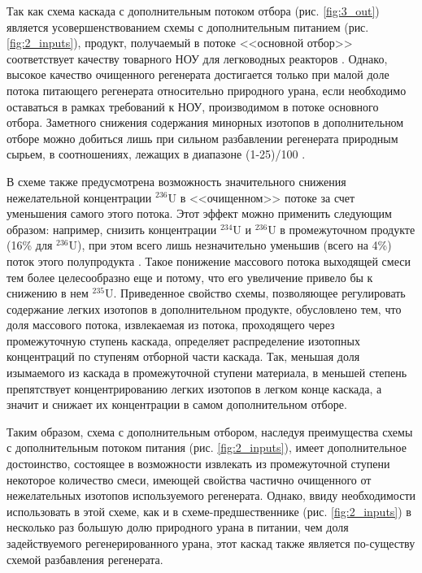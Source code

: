 Так как схема каскада с дополнительным потоком отбора (рис. \ref{fig:3_out}) является усовершенствованием схемы с дополнительным питанием (рис. \ref{fig:2_inputs}), продукт, получаемый в потоке <<основной отбор>> соответствует качеству товарного НОУ для легководных реакторов \cite{palkinSeparationUraniumIsotopes2010}. Однако, высокое качество очищенного регенерата достигается только при малой доле потока питающего регенерата относительно природного урана, если необходимо оставаться в рамках требований к НОУ, производимом в потоке основного отбора. Заметного снижения содержания минорных изотопов в дополнительном отборе можно добиться лишь при сильном разбавлении регенерата природным сырьем, в соотношениях, лежащих в диапазоне (1-25)/100 \cite{palkinSeparationUraniumIsotopes2010, smirnovKaskadnyeShemyZadachah2012}. 

В схеме также предусмотрена возможность значительного снижения нежелательной концентрации $^{236}$U в <<очищенном>> потоке за счет уменьшения самого этого потока.
Этот эффект можно применить следующим образом: например, снизить концентрации $^{234}$U и  $^{236}$U в промежуточном продукте (16\% для  $^{236}$U), при этом всего лишь незначительно уменьшив (всего на 4\%) поток этого полупродукта \cite{palkinPurificationReprocessedUranium2016}. Такое понижение массового потока выходящей смеси тем более целесообразно еще и потому, что его увеличение привело бы к снижению в нем $^{235}$U. Приведенное свойство схемы, позволяющее регулировать содержание легких изотопов в дополнительном продукте, обусловлено тем, что доля массового потока, извлекаемая из потока, проходящего через промежуточную ступень каскада, определяет распределение изотопных концентраций по ступеням отборной части каскада. Так, меньшая доля изымаемого из каскада в промежуточной ступени материала, в меньшей степень препятствует концентрированию легких изотопов в легком конце каскада, а значит и снижает их концентрации в самом дополнительном отборе.

Таким образом, схема с дополнительным отбором, наследуя преимущества схемы с дополнительным потоком питания (рис. \ref{fig:2_inputs}), имеет дополнительное достоинство, состоящее в возможности извлекать из промежуточной ступени некоторое количество смеси, имеющей свойства частично очищенного от нежелательных изотопов используемого регенерата. Однако, ввиду необходимости использовать в этой схеме, как и в схеме-предшественнике (рис. \ref{fig:2_inputs}) в несколько раз большую долю природного урана в питании, чем доля задействуемого регенерированного урана, этот каскад также является по-существу схемой разбавления регенерата.

